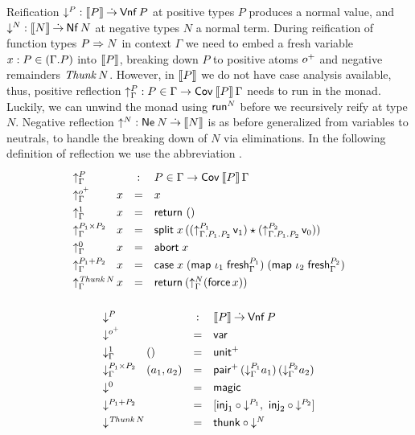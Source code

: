\documentclass[sigplan,screen,fleqn,review]{acmart} %
\begin{document}
Reification $\mathord{\downarrow_{}^{P}} : \mathopen{{[\kern-0.14em[}} P \mathclose{{]\kern-0.14em]}} \mathbin{\dot{\to}} \mathsf{Vnf}\,P$ at positive types $P$ produces
a normal value, and $\mathord{\downarrow_{}^{N}} : \mathopen{{[\kern-0.14em[}} N \mathclose{{]\kern-0.14em]}} \mathbin{\dot{\to}} \mathsf{Nf}\,N$ at negative
types $N$ a
normal term.  During reification of function types $P \Rightarrow N$ in
context $\Gamma$ we need to embed a fresh variable
$x : P \in (\Gamma.P)$ into $\mathopen{{[\kern-0.14em[}} P \mathclose{{]\kern-0.14em]}}$, breaking down $P$ to
positive atoms $o^+$ and negative remainders $\mathit{Thunk}\,N$.
However, in $\mathopen{{[\kern-0.14em[}} P \mathclose{{]\kern-0.14em]}}$ we do not have case analysis available, thus,
positive reflection $\mathord{\uparrow_{\Gamma}^{P}} : P \in \Gamma \to \mathsf{Cov}^{}\,\mathopen{{[\kern-0.14em[}} P \mathclose{{]\kern-0.14em]}}\,\Gamma$
needs to run in the monad.
Luckily, we can unwind the monad using $\mathsf{run}^N$ before we recursively
reify at type $N$.
Negative reflection $\mathord{\uparrow_{}^{N}} : \mathsf{Ne}^{}\,N \mathbin{\dot{\to}} \mathopen{{[\kern-0.14em[}} N \mathclose{{]\kern-0.14em]}}$ is as
before generalized from variables to neutrals, to handle the breaking
down of $N$ via eliminations.
%
In the following definition of reflection we use the abbreviation
.
\[
\def\arraystretch{1.3}
\begin{array}{l@{\,}lcl}%
  \multicolumn 2 l {\upG P} & : & P \in \Gamma \to \Cov\,\den P \, \Gamma\\
  \upG {\patom}         & x & = & x \\
  \upG {\tyone}         & x & = & \treturn\;\ttempty \\
  \upG {P_1 \times P_2} & x & = & \tsplit\;x\,
    \left(
     (\up[\cext{\cext \Gamma {P_1}}{P_2}]{P_1}\,\vv1)
     \star
     (\up[\cext{\cext \Gamma {P_1}}{P_2}]{P_2}\,\vv0)
    \right) \\
  \upG{\tyzero}         & x & = & \tabort\;x \\
  \upG{P_1 + P_2}       & x & = & \tcase\;x
    \; (\tmap\;\iota_1\;\tfresh^{P_1}_\Gamma)
    \; (\tmap\;\iota_2\;\tfresh^{P_2}_\Gamma)
    \\
  \upG{\Thunk N} & x & = & \treturn\,(\upG N (\tforce\,x))
\\[2ex]
\end{array}
\]
\[
\def\arraystretch{1.3}
\begin{array}{l@{\,}lcl}
    \multicolumn 2 l {\down P} & : & \den P \todot \tVNf\,P \\
  \down {\patom} & & = & \tvar \\
  \downG {\tyone} & () & = & \punit \\
  \downG {P_1 \times P_2} & (a_1,a_2) & = & \ppair
    \,(\downG {P_1} a_1)
    \,(\downG {P_2} a_2)
    \\
  \down {\tyzero} & & = & \tmagic \\
  \down {P_1 + P_2} & & = &
    [  \tinj_1 \comp \down{P_1}
    ,\ \tinj_2 \comp \down{P_2}
    ] \\
  \down {\Thunk N} & & = & \tthunk \circ \down N \\
\end{array}
\]
\end{document}
